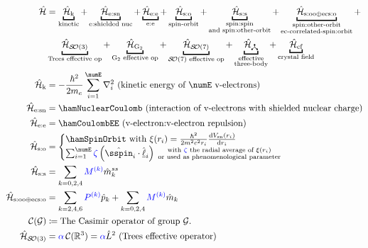 \documentclass{article}
\begin{document}
\begin{align}
	\ham &= \underbracket{\hamKineticSymbol}_{\text{kinetic}}
		 + \underbracket{\hamNuclearCoulombSymbol}_{\text{e:shielded nuc}}
		 + \underbracket{\hamCoulombEESymbol}_{\text{e:e}}
		 + \underbracket{\hamSpinOrbitSymbol}_{\text{spin-orbit}}
		 + \underbracket{\hamSpinSpinSymbol}_{
		 			\substack{
		 				\text{spin:spin} \\ 
		 				\text{and spin:other-orbit}
		 				}
		 			} 
         + \underbracket{\hamSOOplusECSOSymbol}_{
            \substack{
                \text{spin:other-orbit} \\ 
                \text{ec-correlated-spin:orbit}
                }
         } + \\
         & \underbracket{\hamTreesSymbol}_\text{Trees effective op} 
		 + \underbracket{\hamGTwoSymbol}_\text{G${}_2$ effective op} 
		 + \underbracket{\hamSOSevenSymbol}_\text{$\SO{7}$ effective op} 
		 + \underbracket{\ham_{\trispoke}}_{\substack{
            \text{effective} \\
            \text{three-body}}}
         + \underbracket{\hamCrystalFieldSymbol}_{\text{crystal field}} \\
	\hamKineticSymbol &= -\frac{\hbar^2}{2m_e}\sum_{i=1}^\numE \nabla_i^2 \text{ (kinetic energy of $\numE$ v-electrons)}\\
	\hamNuclearCoulombSymbol &= \hamNuclearCoulomb \text{ (interaction of v-electrons with shielded nuclear charge)} \\
	\ham_\text{e:e} &= \hamCoulombEE \text{ (v-electron:v-electron repulsion)} \\  
	\hamSpinOrbitSymbol &= \begin{cases} 
			\hamSpinOrbit \text{ with } \xi{(r_i)} = \frac{\hbar^2}{2 m^2 c^2 r_i} \frac{\diff{V_\text{sn}(r_i)}}{\diff{r_i}} \\
			\sum_{i=1}^\numE \spinZeta \paren{\op{\sspin}_i \cdot \op{\lorb}_i} {{\substack{
						\text{ with $\spinZeta$ the radial average of $\xi(r_i)$} \\ 
						\text{ or used as phenomenological parameter}  
						}
					}}    
			\end{cases} \\    
	\hamSpinSpinSymbol &= \hamSpinSpin \\  
	\hamSOOplusECSOSymbol &= \hamSOOplusECSO \\ 
	\nonumber \casimir{\anyGroup} &\DEF \text{The Casimir operator of group $\anyGroup$.}\\ 
	\hamTreesSymbol &= \casimirAlpha\casimir{\mathbb{R}^3} = \casimirAlpha \op{L}^2 \text{ (Trees effective operator)} \\

\end{align}
\end{document}
